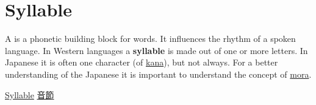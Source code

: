 \section{Syllable}
\label{sec:Syllable}

A  is a phonetic building block for
words. It influences the rhythm of a spoken language. In Western languages a
\textbf{syllable} is made out of one or more letters. In Japanese it is often
one character (of \hyperref[sec:Kana]{kana}), but not always. For a better
understanding of the Japanese it is important to understand the concept of
\hyperref[sec:Mora]{mora}.

\Link \href{https://en.wikipedia.org/wiki/Syllable}{Syllable}
\Link \href{https://ja.wikipedia.org/wiki/%E9%9F%B3%E7%AF%80}{音節}

